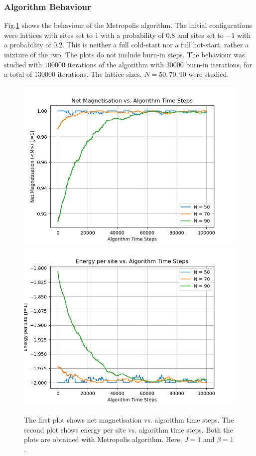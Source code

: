 \documentclass[%
reprint,
 amsmath,amssymb,
 aps,
]{revtex4-2}
\begin{document}
\subsubsection{Algorithm Behaviour}
Fig.\ref{fig:metrobehaviour} shows the behaviour of the Metropolis algorithm. The initial configurations were lattices with sites set to $1$ with a probability of $0.8$ and sites set to $-1$ with a probability of $0.2$. This is neither a full cold-start nor a full hot-start, rather a mixture of the two. The plots do not include burn-in steps. The behaviour was studied with $100000$ iterations of the algorithm with $30000$ burn-in iterations, for a total of $130000$ iterations. The lattice sizes, $N = 50, 70, 90$ were studied.
\begin{figure}[h!]
    \centering
    \includegraphics[width=\columnwidth]{metro_algobehaviour1.png}
    \includegraphics[width=\columnwidth]{metro_algobehaviour2.png}
    \caption{The first plot shows net magnetisation vs. algorithm time steps. The second plot shows energy per site vs. algorithm time steps. Both the plots are obtained with Metropolis algorithm. Here, $J = 1$ and $\beta = 1$.}
    \label{fig:metrobehaviour}
\end{figure}
\end{document}
